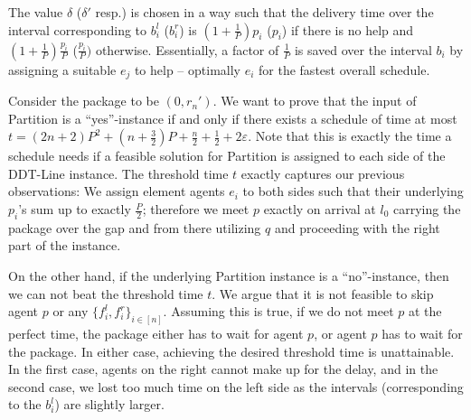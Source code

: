 The value $\delta$ ($\delta'$ resp.) is chosen in a way such that the delivery time over the interval corresponding to $b_i^l$ ($b_i^r$) is $(1+\frac{1}{P})p_i$ ($p_i$) if there is no help and $(1+\frac{1}{P})\frac{p_i}{P}$ ($\frac{p_i}{P})$ otherwise. Essentially, a factor of $\frac{1}{P}$ is saved over the interval $b_i$ by assigning a suitable $e_j$ to help – optimally $e_i$ for the fastest overall schedule.

Consider the package to be $(0,r_n')$. 
We want to prove that the input of Partition is a ``yes''-instance if and only if there exists a schedule of time at most $t=(2n+2)P^2+(n+\frac{3}{2})P + \frac{n}{2} + \frac{1}{2} + 2\varepsilon$. Note that this is exactly the time a schedule needs if a feasible solution for Partition is assigned to each side of the DDT-Line instance. The threshold time $t$ exactly captures our previous observations: We assign element agents $e_i$ to both sides such that their underlying $p_i$'s sum up to exactly $\frac{P}{2}$; therefore we meet $p$ exactly on arrival at $l_0$ carrying the package over the gap and from there utilizing $q$ and proceeding with the right part of the instance.
 
On the other hand, if the underlying Partition instance is a ``no''-instance, then we can not beat the threshold time $t$. We argue that it is not feasible to skip agent $p$ or any $\{f_i^l, f_i^r\}_{i\in [n]}$. Assuming this is true, if we do not meet $p$ at the perfect time, the package either has to wait for agent $p$, or agent $p$ has to wait for the package.
In either case, achieving the desired threshold time is unattainable. In the first case, agents on the right cannot make up for the delay, and in the second case, we lost too much time on the left side as the intervals (corresponding to the $b_i^l$) are slightly larger. 

    
